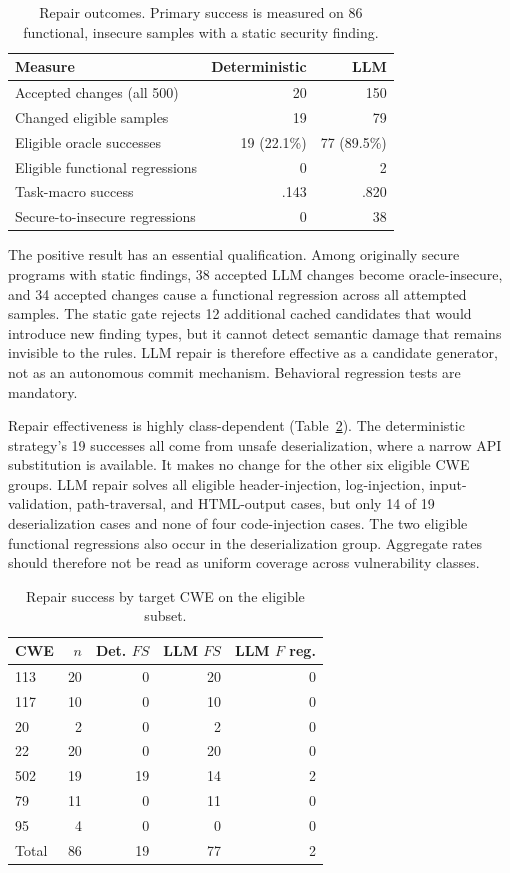 \documentclass[sigconf,nonacm]{acmart}
\begin{document}
\begin{table}[t]
\caption{Repair outcomes. Primary success is measured on 86 functional,
insecure samples with a static security finding.}
\label{tab:repair}
\centering
\small
\begin{tabular}{lrr}
\toprule
Measure & Deterministic & LLM \\
\midrule
Accepted changes (all 500) & 20 & 150 \\
Changed eligible samples & 19 & 79 \\
Eligible oracle successes & 19 (22.1\%) & 77 (89.5\%) \\
Eligible functional regressions & 0 & 2 \\
Task-macro success & .143 & .820 \\
Secure-to-insecure regressions & 0 & 38 \\
\bottomrule
\end{tabular}
\end{table}

The positive result has an essential qualification. Among originally secure
programs with static findings, 38 accepted LLM changes become oracle-insecure,
and 34 accepted changes cause a functional regression across all attempted
samples. The static gate rejects 12 additional cached candidates that would
introduce new finding types, but it cannot detect semantic damage that remains
invisible to the rules. LLM repair is therefore effective as a candidate
generator, not as an autonomous commit mechanism. Behavioral regression tests
are mandatory.

Repair effectiveness is highly class-dependent
(Table~\ref{tab:repair-cwe}). The deterministic strategy's 19 successes all
come from unsafe deserialization, where a narrow API substitution is available.
It makes no change for the other six eligible CWE groups. LLM repair solves all
eligible header-injection, log-injection, input-validation, path-traversal, and
HTML-output cases, but only 14 of 19 deserialization cases and none of four
code-injection cases. The two eligible functional regressions also occur in the
deserialization group. Aggregate rates should therefore not be read as uniform
coverage across vulnerability classes.

\begin{table}[t]
\caption{Repair success by target CWE on the eligible subset.}
\label{tab:repair-cwe}
\centering
\scriptsize
\begin{tabular}{lrrrr}
\toprule
CWE & $n$ & Det. $FS$ & LLM $FS$ & LLM $F$ reg. \\
\midrule
113 & 20 & 0 & 20 & 0 \\
117 & 10 & 0 & 10 & 0 \\
20 & 2 & 0 & 2 & 0 \\
22 & 20 & 0 & 20 & 0 \\
502 & 19 & 19 & 14 & 2 \\
79 & 11 & 0 & 11 & 0 \\
95 & 4 & 0 & 0 & 0 \\
\midrule
Total & 86 & 19 & 77 & 2 \\
\bottomrule
\end{tabular}
\end{table}
\end{document}
